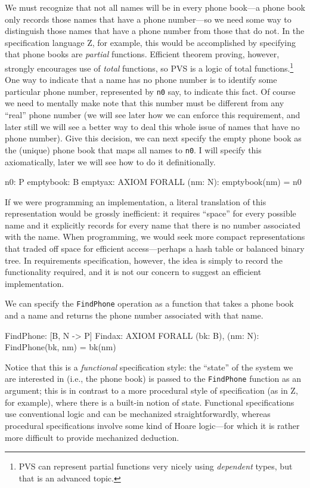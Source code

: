 We must recognize that not all names will be in every phone book---a
phone book only records those names that have a phone number---so we
need some way to distinguish those names that have a phone number from
those that do not.  In the specification language Z, for example, this
would be accomplished by specifying that phone books are {\em
partial\/} functions.  Efficient theorem proving, however, strongly
encourages use of {\em total\/} functions, so PVS is a logic of total
functions.\footnote{PVS can represent partial functions very nicely
using {\em dependent\/} types, but that is an advanced topic.}  One
way to indicate that a name has no phone number is to identify some
particular phone number, represented by {\tt n0} say, to indicate this
fact.  Of course we need to mentally make note that this number must
be different from any ``real'' phone number (we will see later how we
can enforce this requirement, and later still we will see a better way
to deal this whole issue of names that have no phone number).  Give
this decision, we can next
specify the empty phone book as the (unique) phone book that maps all
names to {\tt n0}.  I will specify this axiomatically, later we will
see how to do it definitionally.
\begin{jmrsession}
  n0: P
  emptybook: B
  emptyax: AXIOM   FORALL (nm: N): emptybook(nm) = n0
\end{jmrsession}
If we were programming an implementation, a literal translation of
this representation would be grossly inefficient: it requires
``space'' for every possible name and it explicitly records for every
name that there is no number associated with the name.  When
programming, we would seek more compact representations that traded
off space for efficient access---perhaps a hash table or balanced
binary tree.   In requirements specification, however, the idea is
simply to record the functionality required, and it is not our concern
to suggest an efficient implementation.

We can specify the {\tt FindPhone} operation as a function that takes a
phone book and a name and returns the phone number associated with
that name.
\begin{jmrsession}
  FindPhone: [B, N -> P]
  Findax: AXIOM   FORALL (bk: B), (nm: N):  FindPhone(bk, nm) = bk(nm)
\end{jmrsession}
Notice that this is a {\em functional\/} specification style: the
``state'' of the system we are interested in (i.e., the phone book) is
passed to the {\tt FindPhone} function as an argument; this is in contrast
to a more procedural style of specification (as in Z, for example),
where there is a built-in notion of state.  Functional specifications
use conventional logic and can be mechanized straightforwardly,
whereas procedural specifications involve some kind of Hoare
logic---for which it is rather more difficult to provide mechanized
deduction.

